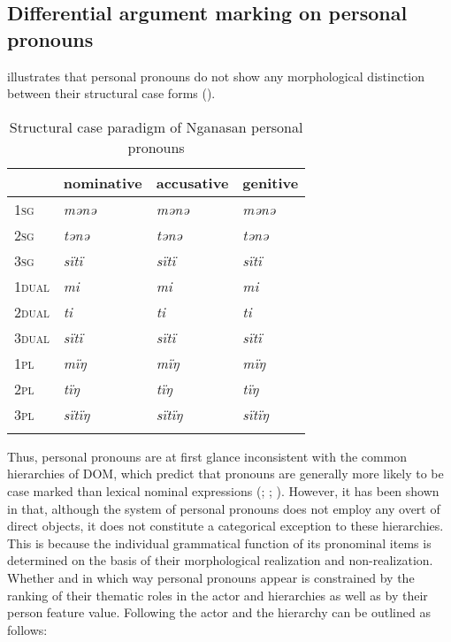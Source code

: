 \documentclass[output=paper]{LSP/langsci}
\begin{document}
\subsection{Differential argument marking on personal pronouns}\label{12-wr-sec:3-2}

 illustrates that  personal pronouns do not show any morphological distinction between their structural case forms (\cf \citealt[93]{WagnerNagy2002Chrestomathia}). 


\begin{table}
\begin{tabularx}{\textwidth}{XXXX} 
\lsptoprule
& nominative & accusative & genitive\\
\midrule
\textsc{1sg} & \textit{mənə} & \textit{mənə} & \textit{mənə}\\
\textsc{2sg} & \textit{tənə} & \textit{tənə} & \textit{tənə}\\
\textsc{3sg} & \textit{sïtï} & \textit{sïtï} & \textit{sïtï}\\
\textsc{1dual} & \textit{mi} & \textit{mi} & \textit{mi}\\
\textsc{2dual} & \textit{ti} & \textit{ti} & \textit{ti}\\
\textsc{3dual} & \textit{sïtï} & \textit{sïtï} & \textit{sïtï}\\
\textsc{1pl} & \textit{mïŋ} & \textit{mïŋ} & \textit{mïŋ}\\
\textsc{2pl} & \textit{tïŋ} & \textit{tïŋ} & \textit{tïŋ}\\
\textsc{3pl} & \textit{sïtïŋ} & \textit{sïtïŋ} & \textit{sïtïŋ}\\
\lspbottomrule
\end{tabularx}
\caption{Structural case paradigm of Nganasan personal pronouns \citep{WagnerNagy2002Chrestomathia}} \label{12-wr-tab:3}
\end{table}


Thus,  personal pronouns are at first glance inconsistent with the common  hierarchies of DOM, which predict that pronouns are generally more likely to be case marked than lexical nominal expressions (\citealt{Bossong1985Differentielle}; \citealt{Croft1988Agreement}; \citealt{Aissen2003Differential}). However, it has been shown in \citet{Wratil2013Distribution} that, although the  system of personal pronouns does not employ any overt  of direct objects, it does not constitute a categorical exception to these hierarchies. 
This is because the individual grammatical function of its pronominal items is determined on the basis of their morphological realization and non-realization. Whether and in which way personal pronouns appear is constrained by the ranking of their thematic roles in the actor and  hierarchies as well as by their person feature value. Following \citet[53--72]{VanValin2001Syntax} the actor and the  hierarchy can be outlined as follows:
\end{document}
